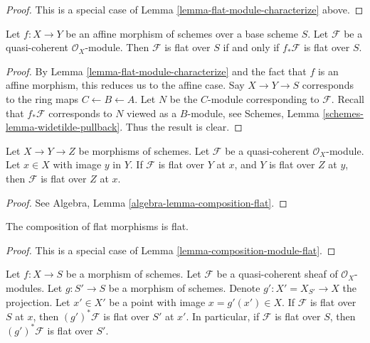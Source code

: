 \begin{proof}
This is a special case of Lemma \ref{lemma-flat-module-characterize}
above.
\end{proof}

\begin{lemma}
\label{lemma-pushforward-flat-affine}
Let $f : X \to Y$ be an affine morphism of schemes over a base scheme $S$.
Let $\mathcal{F}$ be a quasi-coherent $\mathcal{O}_X$-module.
Then $\mathcal{F}$ is flat over $S$ if and only if
$f_*\mathcal{F}$ is flat over $S$.
\end{lemma}

\begin{proof}
By Lemma \ref{lemma-flat-module-characterize} and the fact that
$f$ is an affine morphism, this reduces us to the affine case.
Say $X \to Y \to S$ corresponds to the ring maps $C \leftarrow B \leftarrow A$.
Let $N$ be the $C$-module corresponding to $\mathcal{F}$.
Recall that $f_*\mathcal{F}$ corresponds to $N$ viewed as a $B$-module, see
Schemes, Lemma \ref{schemes-lemma-widetilde-pullback}.
Thus the result is clear.
\end{proof}

\begin{lemma}
\label{lemma-composition-module-flat}
Let $X \to Y \to Z$ be morphisms of schemes. Let $\mathcal{F}$ be a
quasi-coherent $\mathcal{O}_X$-module. Let $x \in X$ with image $y$ in $Y$.
If $\mathcal{F}$ is flat over $Y$ at $x$, and $Y$ is flat over $Z$ at
$y$, then $\mathcal{F}$ is flat over $Z$ at $x$.
\end{lemma}

\begin{proof}
See Algebra, Lemma \ref{algebra-lemma-composition-flat}.
\end{proof}

\begin{lemma}
\label{lemma-composition-flat}
The composition of flat morphisms is flat.
\end{lemma}

\begin{proof}
This is a special case of Lemma \ref{lemma-composition-module-flat}.
\end{proof}

\begin{lemma}
\label{lemma-base-change-module-flat}
Let $f : X \to S$ be a morphism of schemes.
Let $\mathcal{F}$ be a quasi-coherent sheaf of $\mathcal{O}_X$-modules.
Let $g : S' \to S$ be a morphism of schemes.
Denote $g' : X' = X_{S'} \to X$ the projection.
Let $x' \in X'$ be a point with image $x = g'(x') \in X$.
If $\mathcal{F}$ is flat over $S$ at $x$, then
$(g')^*\mathcal{F}$ is flat over $S'$ at $x'$.
In particular, if $\mathcal{F}$ is flat over $S$, then
$(g')^*\mathcal{F}$ is flat over $S'$.
\end{lemma}


